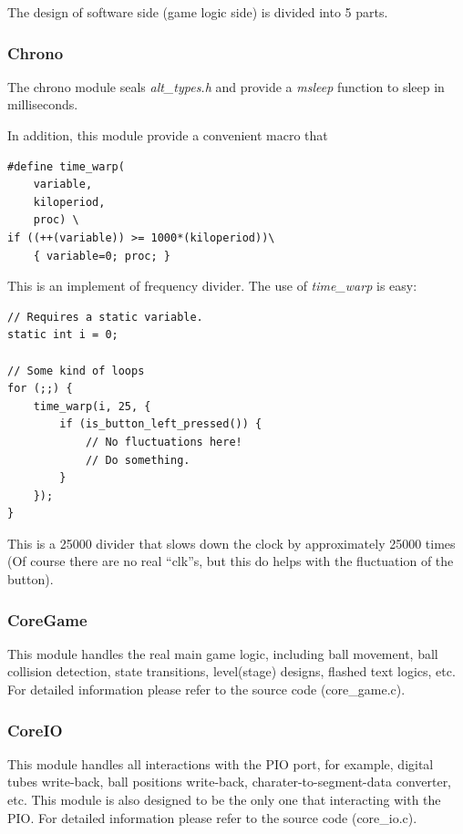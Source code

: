 \documentclass[conference]{IEEEtran}
\begin{document}
The design of software side (game logic side) is divided into 5 parts.

\subsubsection{Chrono}
The chrono module seals \emph{alt\_types.h} and provide a \emph{msleep} function to sleep in milliseconds.

In addition, this module provide a convenient macro that 
\begin{lstlisting}
#define time_warp(
    variable, 
    kiloperiod, 
    proc) \
if ((++(variable)) >= 1000*(kiloperiod))\
    { variable=0; proc; }
\end{lstlisting}

This is an implement of frequency divider. The use of \emph{time\_warp} is easy:

\begin{lstlisting}
// Requires a static variable.
static int i = 0;

// Some kind of loops
for (;;) {
    time_warp(i, 25, {
        if (is_button_left_pressed()) {
            // No fluctuations here!
            // Do something.
        }
    });    
}
\end{lstlisting}

This is a 25000 divider that slows down the clock by approximately 25000 times (Of course there are no real ``clk''s, but this do helps with the fluctuation of the button).

\subsubsection{CoreGame}
This module handles the real main game logic, including ball movement, ball collision detection, state transitions, level(stage) designs, flashed text logics, etc. For detailed information please refer to the source code (core\_game.c).

\subsubsection{CoreIO}
This module handles all interactions with the PIO port, for example, digital tubes write-back, ball positions write-back, charater-to-segment-data converter, etc. This module is also designed to be the only one that interacting with the PIO. For detailed information please refer to the source code (core\_io.c).
\end{document}
